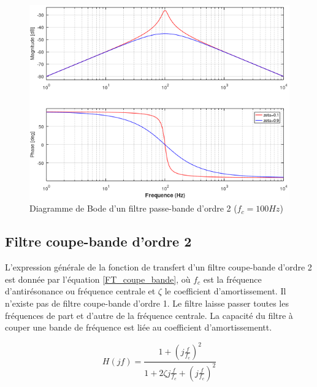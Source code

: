 	\begin{figure}[h!]
		\centering
		\includegraphics[scale=0.75]{images/Bode_passe_bande.png}
		\caption{Diagramme de Bode d'un filtre passe-bande d'ordre 2 ($f_{c}=100 Hz$)}	
		\label{Fig:Bode_passe_bande} 
	\end{figure}
	
	\subsection{Filtre coupe-bande d'ordre 2}
	L'expression générale de la fonction de transfert d'un filtre coupe-bande d'ordre 2 est donnée par l'équation \ref{FT_coupe_bande}, où $f_{c}$ est la fréquence d'antirésonance ou fréquence centrale et $\zeta$ le coefficient d'amortissement. Il n'existe pas de filtre coupe-bande d'ordre 1. Le filtre laisse passer toutes les fréquences de part et d'autre de la fréquence centrale. La capacité du filtre à couper une bande de fréquence est liée au coefficient d'amortissementt.
	
	\begin{equation}\label{FT_coupe_bande}
	H(jf) = \frac{1+(j\frac{f}{f_{c}})^{2}}{1+2\zeta j\frac{f}{f_{c}}+(j\frac{f}{f_{c}})^{2}}
	\end{equation}
	
